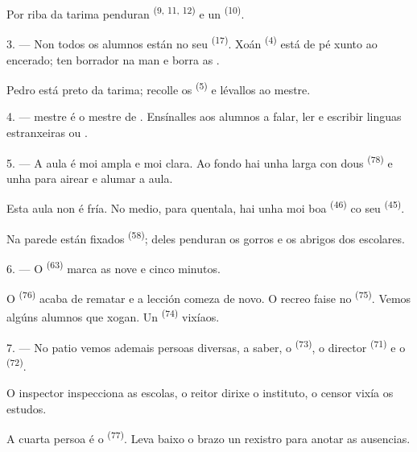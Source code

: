 Por riba da tarima penduran  \textsuperscript{(9, 11, 12)} e un
 \textsuperscript{(10)}.

3. --- Non todos os alumnos están no seu  \textsuperscript{(17)}. Xoán
\textsuperscript{(4)} está de pé xunto ao encerado; ten  borrador na man e
borra as .

Pedro está preto da tarima; recolle os 
\textsuperscript{(5)} e lévallos ao mestre.

4. ---  mestre é o mestre de . Ensínalles aos
alumnos a falar, ler e escribir linguas estranxeiras  ou .

5. --- A aula é moi ampla e moi clara. Ao fondo hai unha  larga con
dous  \textsuperscript{(78)} e unha  para
airear e alumar a aula.

Esta aula non é fría. No medio, para quentala, hai unha  moi boa
\textsuperscript{(46)} co seu  \textsuperscript{(45)}.

Na parede están fixados  \textsuperscript{(58)}; deles penduran
os gorros e os abrigos dos escolares.

\VUsaut{5.2mm}
\VUsaut{3.6mm}

6. --- O  \textsuperscript{(63)} marca as nove e cinco minutos.

O  \textsuperscript{(76)} acaba de rematar e a lección comeza de
novo. O recreo faise no  \textsuperscript{(75)}. Vemos algúns alumnos
que xogan. Un  \textsuperscript{(74)} vixíaos.

7. --- No patio vemos ademais persoas diversas, a saber, o 
\textsuperscript{(73)}, o director  \textsuperscript{(71)} e o
 \textsuperscript{(72)}.

O inspector inspecciona as escolas, o reitor dirixe o instituto, o censor vixía os
estudos.

A cuarta persoa é o  \textsuperscript{(77)}. Leva baixo o brazo un
rexistro para anotar as ausencias.

